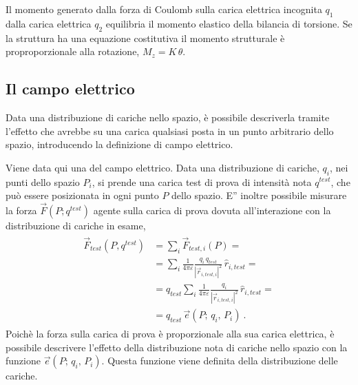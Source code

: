 \documentclass[letterpaper,10pt,italian]{jupyterBook}
\begin{document}
\sphinxAtStartPar
Il momento generato dalla forza di Coulomb sulla carica elettrica incognita \(q_1\) dalla carica elettrica \(q_2\) equilibria il momento elastico della bilancia di torsione. Se la struttura ha una equazione costitutiva il momento strutturale è proproporzionale alla rotazione, \(M_z = K \, \theta\).

\sphinxAtStartPar
{} 

\begin{figure}[htbp]
\centering

\noindent{}
\end{figure}


\subsection{Il campo elettrico}
\label{\detokenize{ch/electromagnetism/electrostatics:il-campo-elettrico}}\label{\detokenize{ch/electromagnetism/electrostatics:physics-hs-electromagnetism-electrostatics-e-field}}
\sphinxAtStartPar
Data una distribuzione di cariche nello spazio, è possibile descriverla tramite l’effetto che avrebbe su una carica qualsiasi posta in un punto arbitrario dello spazio, introducendo la definizione di campo elettrico.

\sphinxAtStartPar
Viene data qui una  del campo elettrico. Data una distribuzione di cariche, \(q_i\), nei punti dello spazio \(P_i\), si prende una carica test \sphinxhyphen{} di prova \sphinxhyphen{} di intensità nota \(q^{test}\), che può essere posizionata in ogni punto \(P\) dello spazio. E” inoltre possibile misurare la forza \(\vec{F}(P; q^{test})\) agente sulla carica di prova dovuta all’interazione con la distribuzione di cariche in esame,
\begin{equation*}
\begin{split}\begin{aligned}
  \vec{F}_{test}(P, q^{test})
  & = \sum_i \vec{F}_{test,i}(P) = \\
  & = \sum_i \frac{1}{4 \pi \varepsilon}\frac{q_i \, q_{test}}{|\vec{r}_{i,test,i}|^2} \, \hat{r}_{i,test} = \\
  & = q_{test} \sum_i \frac{1}{4 \pi \varepsilon}\frac{q_i}{|\vec{r}_{i,test,i}|^2} \, \hat{r}_{i,test} = \\
  & = q_{test} \, \vec{e}(P; \, q_i, \, P_i) \ .
\end{aligned}\end{split}
\end{equation*}
\sphinxAtStartPar
Poichè la forza sulla carica di prova è proporzionale alla sua carica elettrica, è possibile descrivere l’effetto della distribuzione nota di cariche nello spazio con la funzione \(\vec{e}(P; \, q_i, \, P_i)\). Questa funzione viene definita  della distribuzione delle cariche.
\end{document}
